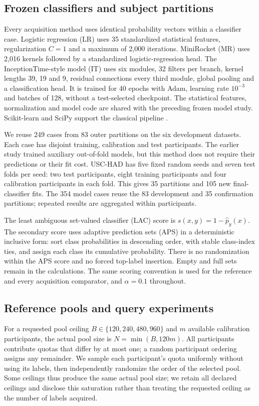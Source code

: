 \documentclass[pdflatex,sn-basic,Numbered,iicol]{sn-jnl}
\begin{document}
\subsection{Frozen classifiers and subject partitions}
Every acquisition method uses identical probability vectors within a classifier case. Logistic regression (LR) uses 35 standardized statistical features, regularization $C=1$ and a maximum of 2,000 iterations. MiniRocket (MR) uses 2,016 kernels followed by a standardized logistic-regression head. The InceptionTime-style model (IT) uses six modules, 32 filters per branch, kernel lengths 39, 19 and 9, residual connections every third module, global pooling and a classification head. It is trained for 40 epochs with Adam, learning rate $10^{-3}$ and batches of 128, without a test-selected checkpoint. The statistical features, normalization and model code are shared with the preceding frozen model study. Scikit-learn and SciPy support the classical pipeline \cite{sklearn,scipy}.

We reuse 249 cases from 83 outer partitions on the six development datasets. Each case has disjoint training, calibration and test participants. The earlier study trained auxiliary out-of-fold models, but this method does not require their predictions or their fit cost. USC-HAD has five fixed random seeds and seven test folds per seed: two test participants, eight training participants and four calibration participants in each fold. This gives 35 partitions and 105 new final-classifier fits. The 354 model cases reuse the 83 development and 35 confirmation partitions; repeated results are aggregated within participants.

The least ambiguous set-valued classifier (LAC) score \cite{sadinle} is $s(x,y)=1-\widehat p_y(x)$. The secondary score uses adaptive prediction sets (APS) \cite{romano} in a deterministic inclusive form: sort class probabilities in descending order, with stable class-index ties, and assign each class its cumulative probability. There is no randomization within the APS score and no forced top-label insertion. Empty and full sets remain in the calculations. The same scoring convention is used for the reference and every acquisition comparator, and $\alpha=0.1$ throughout.

\subsection{Reference pools and query experiments}
For a requested pool ceiling $B\in\{120,240,480,960\}$ and $m$ available calibration participants, the actual pool size is $N=\min(B,120m)$. All participants contribute quotas that differ by at most one; a random participant ordering assigns any remainder. We sample each participant's quota uniformly without using its labels, then independently randomize the order of the selected pool. Some ceilings thus produce the same actual pool size; we retain all declared ceilings and disclose this saturation rather than treating the requested ceiling as the number of labels acquired.
\end{document}
